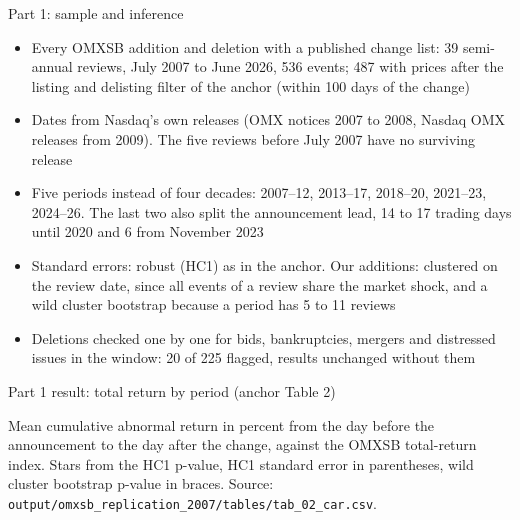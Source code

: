 \documentclass[aspectratio=169]{beamer}
\begin{document}
\begin{frame}{Part 1: sample and inference}
  \begin{itemize}
    \item Every OMXSB addition and deletion with a published change list: 39 semi-annual
      reviews, July 2007 to June 2026, 536 events; 487 with prices after the
      listing and delisting filter of the anchor (within 100 days of the change)
    \item Dates from Nasdaq's own releases (OMX notices 2007 to 2008, Nasdaq OMX
      releases from 2009). The five reviews before July 2007 have no surviving release
    \item Five periods instead of four decades: 2007--12, 2013--17, 2018--20, 2021--23,
      2024--26. The last two also split the announcement lead, 14 to 17 trading
      days until 2020 and 6 from November 2023
    \item Standard errors: robust (HC1) as in the anchor. Our additions: clustered
      on the review date, since all events of a review share the market shock, and a
      wild cluster bootstrap because a period has 5 to 11 reviews
    \item Deletions checked one by one for bids, bankruptcies, mergers and
      distressed issues in the window: 20 of 225 flagged, results unchanged without them
  \end{itemize}
\end{frame}

\begin{frame}{Part 1 result: total return by period (anchor Table 2)}
  \centering\small
  

  \bigskip\raggedright\footnotesize
  Mean cumulative abnormal return in percent from the day before the announcement to the day
  after the change, against the OMXSB total-return index. Stars from the HC1 p-value, HC1 standard
  error in parentheses, wild cluster bootstrap p-value in braces. Source:
  \texttt{output/omxsb\_replication\_2007/tables/tab\_02\_car.csv}.
\end{frame}
\end{document}
